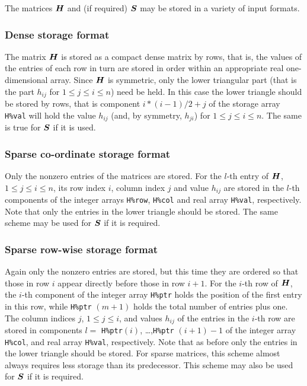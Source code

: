 \documentclass{galahad}
\begin{document}

\galmatrix
The matrices ${\bm{H}}$ and (if required) ${\bm{S}}$
may be stored in a variety of input formats.

\subsubsection{Dense storage format}\label{dense}
The matrix ${\bm{H}}$ is stored as a compact
dense matrix by rows, that is, the values of the entries of each row in turn are
stored in order within an appropriate real one-dimensional array.
Since ${\bm{H}}$ is symmetric, only the lower triangular part (that is the part
$h_{ij}$ for $1 \leq j \leq i \leq n$) need be held. In this case
the lower triangle should be stored by rows, that is
component $i \ast (i-1)/2 + j$ of the storage array {\tt H\%val}
will hold the value $h_{ij}$ (and, by symmetry, $h_{ji}$)
for $1 \leq j \leq i \leq n$. The same is true for ${\bm{S}}$ if it is used.

\subsubsection{Sparse co-ordinate storage format}\label{coordinate}
Only the nonzero entries of the matrices are stored.
For the $l$-th entry of ${\bm{H}}$, $1 \leq j \leq i \leq n$,
its row index $i$, column index $j$ and value $h_{ij}$
are stored in the $l$-th components of the integer arrays {\tt H\%row},
{\tt H\%col} and real array {\tt H\%val}, respectively.
Note that only the entries in the lower triangle should be stored.
The same scheme may be used for ${\bm{S}}$ if it is required.

\subsubsection{Sparse row-wise storage format}\label{rowwise}
Again only the nonzero entries are stored, but this time
they are ordered so that those in row $i$ appear directly before those
in row $i+1$. For the $i$-th row of ${\bm{H}}$, the $i$-th component of the
integer array {\tt H\%ptr} holds the position of the first entry in this row,
while {\tt H\%ptr} $(m+1)$ holds the total number of entries plus one.
The column indices $j$, $1 \leq j \leq i$, and values $h_{ij}$ of the
entries in the $i$-th row are stored in components
$l =$ {\tt H\%ptr}$(i)$, \ldots ,{\tt H\%ptr} $(i+1)-1$ of the
integer array {\tt H\%col}, and real array {\tt H\%val}, respectively.
Note that as before only the entries in the lower triangle should be stored.
For sparse matrices, this scheme almost always requires less storage than
its predecessor.
This scheme may also be used for ${\bm{S}}$ if it is required.
\end{document}
